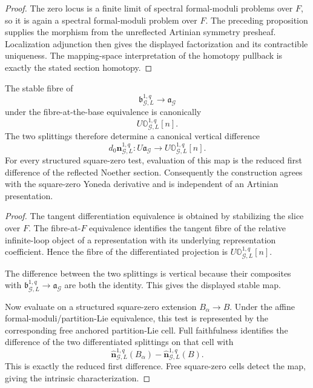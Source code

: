 \begin{proof}
The zero locus is a finite limit of spectral formal-moduli problems over $F$, so it
is again a spectral formal-moduli problem over $F$.  The preceding proposition
supplies the morphism from the unreflected Artinian symmetry presheaf.  Localization
adjunction then gives the displayed factorization and its contractible uniqueness.
The mapping-space interpretation of the homotopy pullback is exactly the stated
section homotopy.
\end{proof}

\begin{theorem}
\label{thm:symmetry-noether-differentiated-retractive-noether-algebroid}
The stable fibre of
\[
\mathfrak b_{\mathcal G,L}^{1,q}
\longrightarrow
\mathfrak a_{\mathcal G}
\]
under the fibre-at-the-base equivalence is canonically
\[
U\mathbb O_{\mathcal G,L}^{1,q}[n].
\]
The two splittings therefore determine a canonical vertical difference
\[
\boxed{
d_0\mathbf n_{\mathcal G,L}^{1,q}:
U\mathfrak a_{\mathcal G}
\longrightarrow
U\mathbb O_{\mathcal G,L}^{1,q}[n].
}
\]
For every structured square-zero test, evaluation of this map is the reduced first
difference of the reflected Noether section.  Consequently the construction agrees
with the square-zero Yoneda derivative and is independent of an Artinian
presentation.
\end{theorem}

\begin{proof}
The tangent differentiation equivalence is obtained by stabilizing the slice over
$F$.  The fibre-at-$F$ equivalence identifies the tangent fibre of the relative
infinite-loop object of a representation with its underlying representation
coefficient.  Hence the fibre of the differentiated projection is
$U\mathbb O_{\mathcal G,L}^{1,q}[n]$.

The difference between the two splittings is vertical because their composites
with $\mathfrak b_{\mathcal G,L}^{1,q}\to\mathfrak a_{\mathcal G}$ are both the
identity.  This gives the displayed stable map.

Now evaluate on a structured square-zero extension $B_\alpha\to B$.  Under the
affine formal-moduli/partition-Lie equivalence, this test is represented by the
corresponding free anchored partition-Lie cell.  Full faithfulness identifies the
difference of the two differentiated splittings on that cell with
\[
\widehat{\mathbf n}_{\mathcal G,L}^{1,q}(B_\alpha)
-
\widehat{\mathbf n}_{\mathcal G,L}^{1,q}(B).
\]
This is exactly the reduced first difference.  Free square-zero cells detect the
map, giving the intrinsic characterization.
\end{proof}

